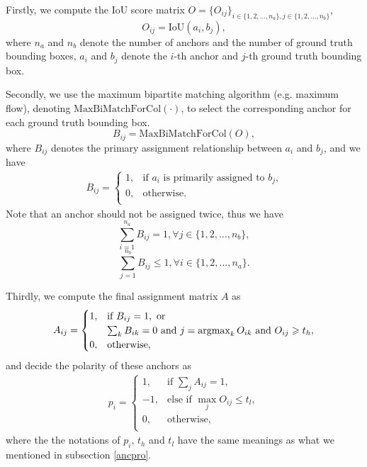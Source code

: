 Firstly, we compute the IoU score matrix $O = \{O_{ij}\}_{i \in \{1,2,\ldots,n_a\}, j \in \{1,2,\ldots,n_b\}}$,
\begin{equation}
	O_{ij} = \text{IoU}(a_i, b_j),
\end{equation}
where $n_a$ and $n_b$ denote the number of anchors and the number of ground truth bounding boxes, $a_i$ and $b_j$ denote the $i$-th anchor and $j$-th ground truth bounding box.

Secondly, we use the maximum bipartite matching algorithm (e.g. maximum flow), denoting $\text{MaxBiMatchForCol}(\cdot)$, to select the corresponding anchor for each ground truth bounding box.
\begin{equation}
	B_{ij} = \text{MaxBiMatchForCol}(O),
\end{equation}
where $B_{ij}$ denotes the primary assignment relationship between $a_i$ and $b_j$, and we have
\begin{equation}
\begin{aligned}
	B_{ij} = \begin{cases}
		1, & \text{if $a_i$ is primarily assigned to $b_j$,}\\
		0, & \text{otherwise}.\\
	\end{cases}
\end{aligned}
\end{equation}
Note that an anchor should not be assigned twice, thus we have
\begin{equation}
	\sum_{i=1}^{n_a}B_{ij} = 1, \forall j \in \{1,2,\ldots,n_b\},
\end{equation}
\begin{equation}
	\sum_{j=1}^{n_b}B_{ij} \leqslant 1, \forall i \in \{1,2,\ldots,n_a\}.
\end{equation}

Thirdly, we compute the final assignment matrix $A$ as
\begin{equation}
\begin{aligned}
	A_{ij} = \begin{cases}
		1, & \text{if } B_{ij} = 1,\text{ or }\\
		& \sum_{k}B_{ik} = 0 \text{ and } j = \operatorname*{argmax}_{k} O_{ik} \text{ and } O_{ij} \geqslant t_h, \\
		0, & \text{otherwise},\\
	\end{cases}
\end{aligned}
\end{equation}
and decide the polarity of these anchors as
\begin{equation}
\begin{aligned}
	p_i = \begin{cases}
		1, & \text{if } \sum_{j}A_{ij} = 1, \\
		-1, & \text{else if } \max_{j}O_{ij} \leqslant t_l, \\
		0, & \text{otherwise},\\
	\end{cases}
\end{aligned}
\end{equation}
where the the notations of $p_i$, $t_h$ and $t_l$ have the same meanings as what we mentioned in subsection \ref{ancpro}.

